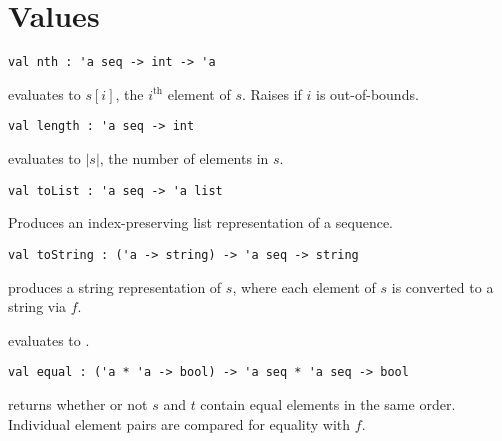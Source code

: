 \section{Values}

\begin{gram}[nth]
\label{gr:nth}
\begin{verbatim}
val nth : 'a seq -> int -> 'a
\end{verbatim}
 evaluates to $s[i]$, the $i^\text{th}$ element of $s$.
Raises  if $i$ is out-of-bounds.
\end{gram}

\begin{gram}[length]
\label{gr:length}
\begin{verbatim}
val length : 'a seq -> int
\end{verbatim}
 evaluates to $|s|$, the number of elements in $s$.
\end{gram}

\begin{gram}[toList]
\label{gr:toList}
\begin{verbatim}
val toList : 'a seq -> 'a list
\end{verbatim}
Produces an index-preserving list representation of a sequence.
\end{gram}

\begin{flex}
\begin{gram}[toString]
\label{gr:toString}
\begin{verbatim}
val toString : ('a -> string) -> 'a seq -> string
\end{verbatim}
 produces a string representation of $s$, where each
element of $s$ is converted to a string via $f$.
\end{gram}
\begin{example}
 evaluates to .
\end{example}
\end{flex}

\begin{gram}[equal]
\label{gr:equal}
\begin{verbatim}
val equal : ('a * 'a -> bool) -> 'a seq * 'a seq -> bool
\end{verbatim}
 returns whether or not $s$ and $t$ contain equal elements
in the same order. Individual element pairs are compared for equality with $f$.
\end{gram}

